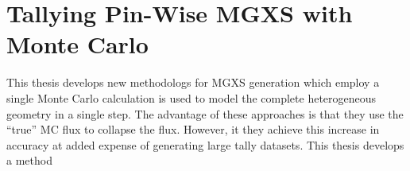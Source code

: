 \documentclass[12pt,twoside]{mitthesis-exec}
\begin{document}
%
%

\section*{Tallying Pin-Wise MGXS with Monte Carlo}

This thesis develops new methodologs for MGXS generation which employ a single Monte Carlo calculation is used to model the complete heterogeneous geometry in a single step. The advantage of these approaches is that they use the ``true'' MC flux to collapse the flux. However, it they achieve this increase in accuracy  at added expense of generating large tally datasets. This thesis develops a method 
\end{document}
